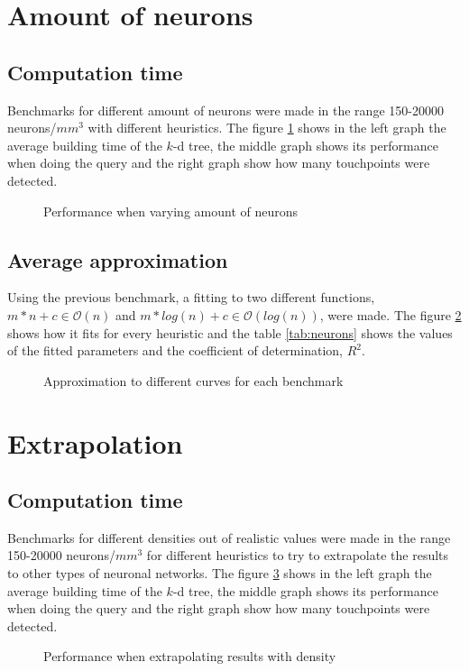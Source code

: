 \section{Amount of neurons}
\subsection{Computation time}
Benchmarks for different amount of neurons were made in the range 150-20000 neurons/$mm^3$ with different heuristics. The figure \ref{fig:neurons} shows in the left graph the average building time of the $k$-d tree, the middle graph shows its performance when doing the query and the right graph show how many touchpoints were detected.
\begin{figure}[h!]
  \centering
  
  \caption{Performance when varying amount of neurons}
  \label{fig:neurons}
\end{figure}

\subsection{Average approximation}
Using the previous benchmark, a fitting to two different functions, $m*n+c \in \mathcal{O}(n)$ and $m*log(n)+c \in \mathcal{O}(log(n))$, were made. The figure \ref{fig:approx_neurons} shows how it fits for every heuristic and the table \ref{tab:neurons} shows the values of the fitted parameters and the coefficient of determination, $R^2$.
\begin{figure}[h!]
  \centering
  
  \caption{Approximation to different curves for each benchmark}
  \label{fig:approx_neurons}
\end{figure}


\section{Extrapolation}
\subsection{Computation time}
Benchmarks for different densities out of realistic values were made in the range 150-20000 neurons/$mm^3$ for different heuristics to try to extrapolate the results to other types of neuronal networks. The figure \ref{fig:extrapolation} shows in the left graph the average building time of the $k$-d tree, the middle graph shows its performance when doing the query and the right graph show how many touchpoints were detected.
\begin{figure}[h!]
  \centering
  
  \caption{Performance when extrapolating results with density}
  \label{fig:extrapolation}
\end{figure}

